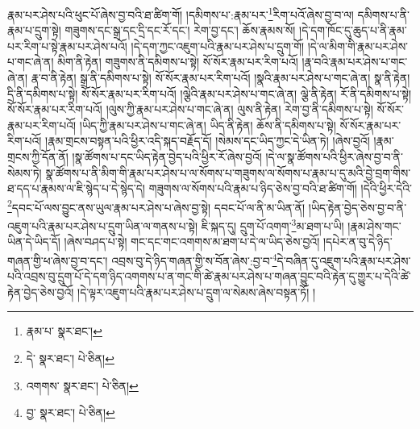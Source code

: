རྣམ་པར་ཤེས་པའི་ཕུང་པོ་ཞེས་བྱ་བའི་ཐ་ཚིག་གོ། །དམིགས་པ་:རྣམ་པར་\footnote{རྣམ་པ་  སྣར་ཐང་། }རིག་པའོ་ཞེས་བྱ་བ་ལ། དམིགས་པ་ནི་རྣམ་པ་དྲུག་སྟེ། གཟུགས་དང་སྒྲ་དང་དྲི་དང་རོ་དང་། རེག་བྱ་དང་། ཆོས་རྣམས་སོ། །དེ་དག་ཁོང་དུ་ཆུད་པ་ནི་རྣམ་པར་རིག་པ་སྟེ་རྣམ་པར་ཤེས་པའོ། །དེ་དག་ཀྱང་འཇུག་པའི་རྣམ་པར་ཤེས་པ་དྲུག་གོ། །དེ་ལ་མིག་གི་རྣམ་པར་ཤེས་པ་གང་ཞེ་ན། མིག་ནི་རྟེན། གཟུགས་ནི་དམིགས་པ་སྟེ། སོ་སོར་རྣམ་པར་རིག་པའོ། །རྣ་བའི་རྣམ་པར་ཤེས་པ་གང་ཞེ་ན། རྣ་བ་ནི་རྟེན། སྒྲ་ནི་དམིགས་པ་སྟེ། སོ་སོར་རྣམ་པར་རིག་པའོ། །སྣའི་རྣམ་པར་ཤེས་པ་གང་ཞེ་ན། སྣ་ནི་རྟེན། དྲི་ནི་དམིགས་པ་སྟེ། སོ་སོར་རྣམ་པར་རིག་པའོ། །ལྕེའི་རྣམ་པར་ཤེས་པ་གང་ཞེ་ན། ལྕེ་ནི་རྟེན། རོ་ནི་དམིགས་པ་སྟེ། སོ་སོར་རྣམ་པར་རིག་པའོ། །ལུས་ཀྱི་རྣམ་པར་ཤེས་པ་གང་ཞེ་ན། ལུས་ནི་རྟེན། རེག་བྱ་ནི་དམིགས་པ་སྟེ། སོ་སོར་རྣམ་པར་རིག་པའོ། །ཡིད་ཀྱི་རྣམ་པར་ཤེས་པ་གང་ཞེ་ན། ཡིད་ནི་རྟེན། ཆོས་ནི་དམིགས་པ་སྟེ། སོ་སོར་རྣམ་པར་རིག་པའོ། །རྣམ་གྲངས་བསྟན་པའི་ཕྱིར་འདི་སྐད་བརྗོད་དོ། །སེམས་དང་ཡིད་ཀྱང་དེ་ཡིན་ཏེ། །ཞེས་བྱའོ། །རྣམ་གྲངས་ཀྱི་དོན་ནོ། །སྣ་ཚོགས་པ་དང་ཡིད་རྟེན་བྱེད་པའི་ཕྱིར་རོ་ཞེས་བྱའོ། །དེ་ལ་སྣ་ཚོགས་པའི་ཕྱིར་ཞེས་བྱ་བ་ནི་སེམས་ཏེ། སྣ་ཚོགས་པ་ནི་མིག་གི་རྣམ་པར་ཤེས་པ་ལ་སོགས་པ་གཟུགས་ལ་སོགས་པ་རྣམ་པ་དུ་མའི་བྱེ་བྲག་གིས་ཐ་དད་པ་རྣམས་ལ་ཇི་སྙེད་པ་དེ་སྙེད་དེ། གཟུགས་ལ་སོགས་པའི་རྣམ་པ་ཉིད་ཅེས་བྱ་བའི་ཐ་ཚིག་གོ། །དེའི་ཕྱིར་དེའི་\footnote{དེ་  སྣར་ཐང་།  པེ་ཅིན། }དབང་པོ་ལས་བྱུང་ནས་ཡུལ་རྣམ་པར་ཤེས་པ་ཞེས་བྱ་སྟེ། དབང་པོ་ལ་ནི་མ་ཡིན་ནོ། །ཡིད་རྟེན་བྱེད་ཅེས་བྱ་བ་ནི་འཇུག་པའི་རྣམ་པར་ཤེས་པ་དྲུག་ཡིན་ལ་གནས་པ་སྟེ། ཇི་སྐད་དུ། དྲུག་པོ་འགག་\footnote{འགགས་  སྣར་ཐང་།  པེ་ཅིན། }མ་ཐག་པ་ཡི། །རྣམ་ཤེས་གང་ཡིན་དེ་ཡིད་དོ། །ཞེས་བཤད་པ་སྟེ། གང་དང་གང་འགགས་མ་ཐག་པ་དེ་ལ་ཡིད་ཅེས་བྱའོ། །དཔེར་ན་བུ་དེ་ཉིད་གཞན་གྱི་ཕ་ཞེས་བྱ་བ་དང་། འབྲས་བུ་དེ་ཉིད་གཞན་གྱི་ས་བོན་ཞེས་:བྱ་བ་\footnote{བྱ་  སྣར་ཐང་།  པེ་ཅིན། }དེ་བཞིན་དུ་འཇུག་པའི་རྣམ་པར་ཤེས་པའི་འབྲས་བུ་དྲུག་པོ་དེ་དག་ཉིད་འགགས་པ་ན་གང་གི་ཚེ་རྣམ་པར་ཤེས་པ་གཞན་བྱུང་བའི་རྟེན་དུ་གྱུར་པ་དེའི་ཚེ་རྟེན་བྱེད་ཅེས་བྱའོ། །དེ་ལྟར་འཇུག་པའི་རྣམ་པར་ཤེས་པ་དྲུག་ལ་སེམས་ཞེས་བསྟན་ཏོ། །
